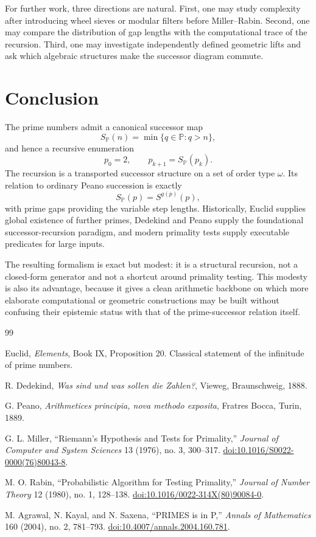 \documentclass[11pt]{article}
\theoremstyle{definition}
\newcommand{\Pp}{\mathbb{P}}
\newcommand{\SP}{S_{\!\Pp}}
\newcommand{\gap}{g}
\begin{document}
For further work, three directions are natural. First, one may study complexity after introducing wheel sieves or modular filters before Miller--Rabin. Second, one may compare the distribution of gap lengths with the computational trace of the recursion. Third, one may investigate independently defined geometric lifts and ask which algebraic structures make the successor diagram commute.

\section{Conclusion}

The prime numbers admit a canonical successor map
\[
\SP(n)=\min\{q\in\Pp:q>n\},
\]
and hence a recursive enumeration
\[
p_0=2,\qquad p_{k+1}=\SP(p_k).
\]
The recursion is a transported successor structure on a set of order type $\omega$. Its relation to ordinary Peano succession is exactly
\[
\SP(p)=S^{\gap(p)}(p),
\]
with prime gaps providing the variable step lengths. Historically, Euclid supplies global existence of further primes, Dedekind and Peano supply the foundational successor-recursion paradigm, and modern primality tests supply executable predicates for large inputs.

The resulting formalism is exact but modest: it is a structural recursion, not a closed-form generator and not a shortcut around primality testing. This modesty is also its advantage, because it gives a clean arithmetic backbone on which more elaborate computational or geometric constructions may be built without confusing their epistemic status with that of the prime-successor relation itself.

\begin{thebibliography}{99}

Euclid,
\emph{Elements}, Book IX, Proposition 20.
Classical statement of the infinitude of prime numbers.

R. Dedekind,
\emph{Was sind und was sollen die Zahlen?},
Vieweg, Braunschweig, 1888.

G. Peano,
\emph{Arithmetices principia, nova methodo exposita},
Fratres Bocca, Turin, 1889.

G. L. Miller,
``Riemann's Hypothesis and Tests for Primality,''
\emph{Journal of Computer and System Sciences} 13 (1976), no. 3, 300--317.
\href{https://doi.org/10.1016/S0022-0000(76)80043-8}{doi:10.1016/S0022-0000(76)80043-8}.

M. O. Rabin,
``Probabilistic Algorithm for Testing Primality,''
\emph{Journal of Number Theory} 12 (1980), no. 1, 128--138.
\href{https://doi.org/10.1016/0022-314X(80)90084-0}{doi:10.1016/0022-314X(80)90084-0}.

M. Agrawal, N. Kayal, and N. Saxena,
``PRIMES is in P,''
\emph{Annals of Mathematics} 160 (2004), no. 2, 781--793.
\href{https://doi.org/10.4007/annals.2004.160.781}{doi:10.4007/annals.2004.160.781}.

\end{thebibliography}
\end{document}
